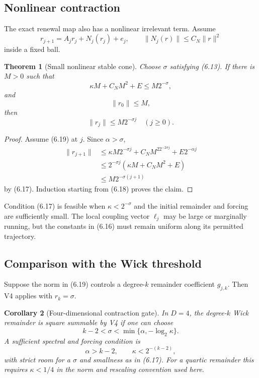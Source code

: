 \documentclass[11pt]{article}
\newtheorem{theorem}{Theorem}[section]
\newtheorem{corollary}[theorem]{Corollary}
\theoremstyle{remark}
\begin{document}
\subsection{Nonlinear contraction}

The exact renewal map also has a nonlinear irrelevant term.  Assume
\[
 r_{j+1}=A_jr_j+N_j(r_j)+e_j,\qquad
 \|N_j(r)\|\le C_N\|r\|^2                                  \tag{6.16}
\]
inside a fixed ball.

\begin{theorem}[Small nonlinear stable cone]
\label{thm:v12v6-nonlinear}
Choose \(\sigma\) satisfying (6.13).  If there is \(M>0\) such that
\[
             \kappa M+C_NM^2+E\le M2^{-\sigma},             \tag{6.17}
\]
and
\[
                              \|r_0\|\le M,                  \tag{6.18}
\]
then
\[
                              \|r_j\|\le M2^{-\sigma j}
                         \quad(j\ge0).                       \tag{6.19}
\]
\end{theorem}

\begin{proof}
Assume (6.19) at \(j\).  Since \(\alpha>\sigma\),
\[
 \begin{split}
 \|r_{j+1}\|
 &\le\kappa M2^{-\sigma j}
       +C_NM^22^{-2\sigma j}+E2^{-\alpha j}\\
 &\le2^{-\sigma j}
       (\kappa M+C_NM^2+E)\\
 &\le M2^{-\sigma(j+1)}
 \end{split}
\]
by (6.17).  Induction starting from (6.18) proves the claim.
\end{proof}

Condition (6.17) is feasible when
\(\kappa<2^{-\sigma}\) and the initial remainder and forcing are
sufficiently small.  The local coupling vector \(\ell_j\) may be
large or marginally running, but the constants in (6.16) must remain
uniform along its permitted trajectory.

\subsection{Comparison with the Wick threshold}

Suppose the norm in (6.19) controls a degree-\(k\) remainder
coefficient \(g_{j,k}\).  Then V4 applies with \(r_k=\sigma\).

\begin{corollary}[Four-dimensional contraction gate]
\label{cor:v12v6-four}
In \(D=4\), the degree-\(k\) Wick remainder is square summable by V4
if one can choose
\[
 k-2<\sigma<
 \min\{\alpha,-\log_2\kappa\}.                              \tag{6.20}
\]
A sufficient spectral and forcing condition is
\[
                              \alpha>k-2,\qquad
                              \kappa<2^{-(k-2)},              \tag{6.21}
\]
with strict room for a \(\sigma\) and smallness as in (6.17).
For a quartic remainder this requires \(\kappa<1/4\) in the norm and
rescaling convention used here.
\end{corollary}
\end{document}
